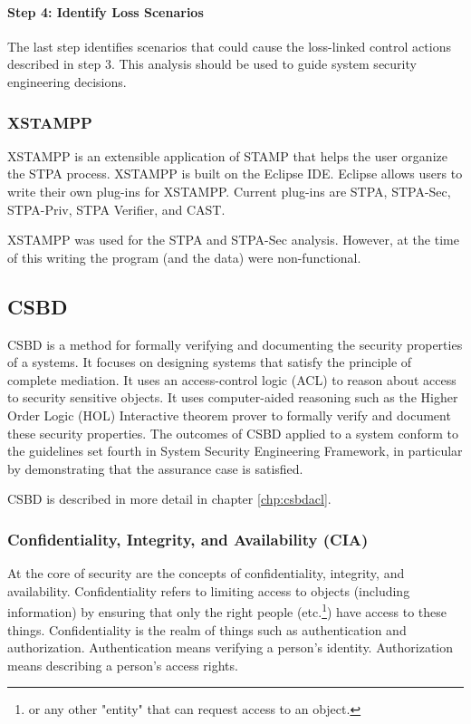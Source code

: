 \documentclass[../../main/main.tex]{subfiles}
\begin{document}
\paragraph*{Step 4: Identify Loss Scenarios}
The last step identifies scenarios that could cause the loss-linked control actions described in step 3.  This analysis should be used to guide system security engineering decisions.


\subsubsection{XSTAMPP}\label{sssec:xstamp}
XSTAMPP is an extensible application of STAMP that helps the user organize the STPA process.  XSTAMPP is built on the Eclipse IDE.  Eclipse allows users to write their own plug-ins for XSTAMPP.  Current plug-ins are STPA, STPA-Sec, STPA-Priv, STPA Verifier, and CAST.  


XSTAMPP was used for the STPA and STPA-Sec analysis.  However, at the time of this writing the program (and the data) were non-functional.
\subsection{CSBD}\label{ssec:csbd}
CSBD is a method for formally verifying and documenting the security properties of a systems.  It focuses on designing systems that satisfy the principle of complete mediation.  It uses an access-control logic (ACL) to reason about access to security sensitive objects.  It uses computer-aided reasoning such as the Higher Order Logic (HOL) Interactive theorem prover to formally verify and document these security properties.  The outcomes of CSBD applied to a system conform to the guidelines set fourth in System Security Engineering Framework, in particular by demonstrating that the assurance case is satisfied.

CSBD is described in more detail in chapter \ref{chp:csbdacl}.

\subsubsection{Confidentiality, Integrity, and Availability (CIA) }\label{sssect:ssmts}
At the core of security are the concepts of confidentiality, integrity, and availability.  Confidentiality refers to limiting access to objects (including information) by ensuring that only the right people (etc.\footnote{or any other "entity" that can request access to an object.}) have access to these things.  Confidentiality is the realm of things such as authentication and authorization.  Authentication means verifying a person's identity.  Authorization means describing a person's access rights. 
\end{document}
